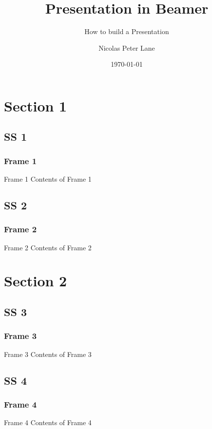 \documentclass[12pt]{beamer}
\title{Presentation in Beamer}
\subtitle{How to build a Presentation}
\author{Nicolas Peter Lane}
\institute{Universidade Estadual de Santa Catarina}
\date{\today}
\begin{document}
\begin{frame}[shrink]
\titlepage
\end{frame}

\section{Section 1}
\subsection{SS 1}
\begin{frame}[shrink]

\frametitle{Frame 1}
\begin{block}{Frame 1}
\pause
Contents of Frame 1
\end{block}
\end{frame}

\subsection{SS 2}
\begin{frame}[shrink]
\frametitle{Frame 2}
\begin{block}{Frame 2}
\pause
Contents of Frame 2
\end{block}
\end{frame}

\section{Section 2}
\subsection{SS 3}
\begin{frame}[shrink]
\frametitle{Frame 3}
\begin{block}{Frame 3}
\pause
Contents of Frame 3
\end{block}
\end{frame}

\subsection{SS 4}
\begin{frame}[shrink]
\frametitle{Frame 4}
\begin{block}{Frame 4}
\pause
Contents of Frame 4
\end{block}
\end{frame}
\end{document}
